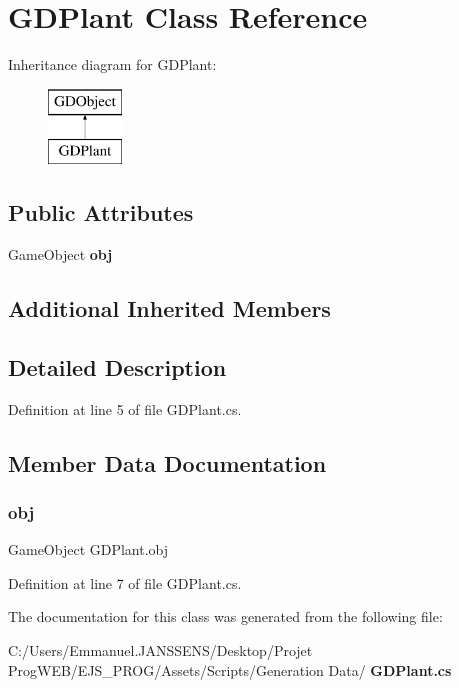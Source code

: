 \section{G\+D\+Plant Class Reference}
\label{class_g_d_plant}
Inheritance diagram for G\+D\+Plant\+:\begin{figure}[H]
\begin{center}
\leavevmode
\includegraphics[height=2.000000cm]{class_g_d_plant}
\end{center}
\end{figure}
\subsection*{Public Attributes}
\begin{DoxyCompactItemize}
\item 
Game\+Object \textbf{ obj}
\end{DoxyCompactItemize}
\subsection*{Additional Inherited Members}


\subsection{Detailed Description}


Definition at line 5 of file G\+D\+Plant.\+cs.



\subsection{Member Data Documentation}
\mbox{\label{class_g_d_plant_a97185b9b6630ea4b608cdcc0dd2ecaff}} 
\subsubsection{obj}
{\footnotesize\ttfamily Game\+Object G\+D\+Plant.\+obj}



Definition at line 7 of file G\+D\+Plant.\+cs.



The documentation for this class was generated from the following file\+:\begin{DoxyCompactItemize}
\item 
C\+:/\+Users/\+Emmanuel.\+J\+A\+N\+S\+S\+E\+N\+S/\+Desktop/\+Projet Prog\+W\+E\+B/\+E\+J\+S\+\_\+\+P\+R\+O\+G/\+Assets/\+Scripts/\+Generation Data/\textbf{ G\+D\+Plant.\+cs}\end{DoxyCompactItemize}

